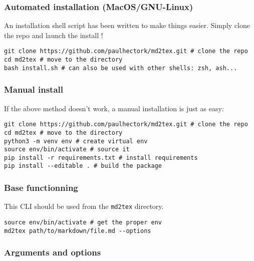 \documentclass[a4paper, 12pt, twoside]{article}
\begin{document}
\subsubsection{Automated installation (MacOS/GNU-Linux)}

An installation shell script has been written to make things easier.
Simply clone the repo and launch the install !

\begin{listing}[h!]
   \begin{verbatim}
git clone https://github.com/paulhectork/md2tex.git # clone the repo
cd md2tex # move to the directory
bash install.sh # can also be used with other shells: zsh, ash...

   \end{verbatim}
\end{listing}
\subsubsection{Manual install}

If the above method doesn't work, a manual installation is just as easy:

\begin{listing}[h!]
   \begin{verbatim}
git clone https://github.com/paulhectork/md2tex.git # clone the repo
cd md2tex # move to the directory
python3 -m venv env # create virtual env
source env/bin/activate # source it
pip install -r requirements.txt # install requirements
pip install --editable . # build the package

   \end{verbatim}
\end{listing}
\subsubsection{Base functionning}

This CLI should be used from the \texttt{md2tex} directory.

\begin{listing}[h!]
   \begin{verbatim}
source env/bin/activate # get the proper env
md2tex path/to/markdown/file.md --options

   \end{verbatim}
\end{listing}
\subsubsection{Arguments and options}
\end{document}

